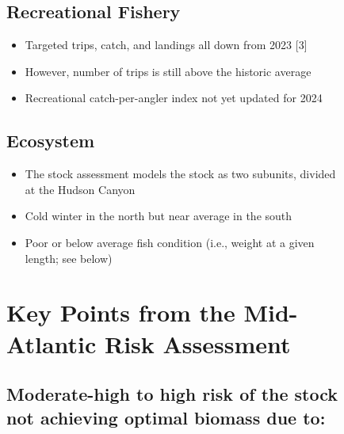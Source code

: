 \documentclass[
  10pt,
  letterpaper,
  DIV=11,
  numbers=noendperiod]{scrartcl}
\providecommand{\tightlist}{%
  \setlength{\itemsep}{0pt}\setlength{\parskip}{0pt}}\usepackage{longtable,booktabs,array}
\begin{document}
\begin{figure}
\begin{minipage}{0.57\linewidth}
\vspace{-0.25cm}
\subsection{Recreational Fishery}

\begin{itemize}
\tightlist
\item
  Targeted trips, catch, and landings all down from 2023 {[}3{]}
\item
  However, number of trips is still above the historic average
\item
  Recreational catch-per-angler index not yet updated for 2024
\end{itemize}

\vspace{-0.25cm}
\subsection{Ecosystem}

\begin{itemize}
\tightlist
\item
  The stock assessment models the stock as two subunits, divided at the
  Hudson Canyon
\item
  Cold winter in the north but near average in the south
\item
  Poor or below average fish condition (i.e., weight at a given length;
  see below)
\end{itemize}

\end{minipage}%
\newline
\begin{minipage}{\linewidth}

\vspace{0.25cm}
\section{Key Points from the Mid-Atlantic Risk Assessment}
\vspace{0.05cm}

\end{minipage}%
\newline
\begin{minipage}{0.57\linewidth}

\raggedright

\subsection{Moderate-high to high risk of the stock not achieving optimal biomass due to:}


\end{minipage}
\end{figure}
\end{document}
